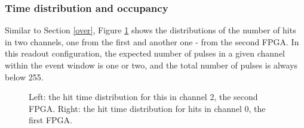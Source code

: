 \subsubsection{Time distribution and occupancy}

Similar to Section \ref{over}, Figure \ref{fig:4} shows the distributions
of the number of hits in two channels, one from the 
first and another one - from the second FPGA. 
In this readout configuration, the expected number of pulses in a given channel
within the event window is one or two, and the total number of pulses is always below 255.

\begin{figure}[!h]
  \hspace{-0.5in}
  \caption{
    Left: the hit time distribution for this in channel 2, the second FPGA. Right: the hit time distribution for hits in channel 0, the first FPGA.
  }
  \label{fig:4}

\end{figure}
